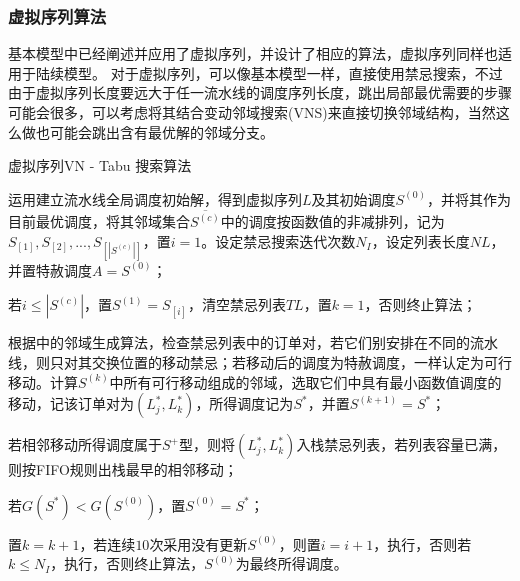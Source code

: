 \subsubsection{虚拟序列算法}
基本模型中已经阐述并应用了虚拟序列，并设计了相应的算法，虚拟序列同样也适用于陆续模型。
对于虚拟序列，可以像基本模型一样，直接使用禁忌搜索，不过由于虚拟序列长度要远大于任一流水线的调度序列长度，跳出局部最优需要的步骤可能会很多，可以考虑将其结合变动邻域搜索(VNS)来直接切换邻域结构，当然这么做也可能会跳出含有最优解的邻域分支。
\begin{algori}
虚拟序列VN - Tabu 搜索算法
\begin{asparaenum}
\renewcommand{\labelenumi}{\bf Step\theenumi~}
\item 运用建立流水线全局调度初始解，得到虚拟序列$L$及其初始调度$S^{(0)}$，并将其作为目前最优调度，将其邻域集合$\overline{S^{(c)}}$中的调度按函数值的非减排列，记为$S_{[1]},S_{[2]},...,S_{[|S^{(c)}|]}$，置$i = 1$。设定禁忌搜索迭代次数$N_I$，设定列表长度$NL$，并置特赦调度$A = S^{(0)}$；
\item 若$i \le |S^{(c)}|$，置$S^{(1)} = S_{[i]}$，清空禁忌列表$TL$，置$k = 1$，否则终止算法；
\item 根据中的邻域生成算法，检查禁忌列表中的订单对，若它们别安排在不同的流水线，则只对其交换位置的移动禁忌；若移动后的调度为特赦调度，一样认定为可行移动。计算$S^{(k)}$中所有可行移动组成的邻域，选取它们中具有最小函数值调度的移动，记该订单对为$(L_j^*, L_k^*)$，所得调度记为$S^*$，并置$S^{(k+1)} = S^*$；
\item 若相邻移动所得调度属于$S^+$型，则将$(L_j^*, L_k^*)$入栈禁忌列表，若列表容量已满，则按FIFO规则出栈最早的相邻移动；
\item 若$G(S^*) < G(S^{(0)})$，置$S^{(0)} = S^*$；
\item 置$k = k + 1$，若连续$10$次采用没有更新$S^{(0)}$，则置$i = i+1$，执行，否则若$k\le N_I$，执行，否则终止算法，$S^{(0)}$为最终所得调度。
\end{asparaenum}
\end{algori}
